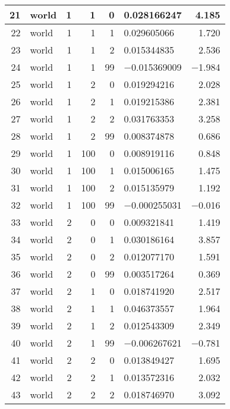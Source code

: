 \begin{longtable}{|r|l|r|r|r|l|r|}
   21 &    world &    1 &    1 &    0 &    0.028166247 &    4.185\\\hline
   22 &    world &    1 &    1 &    1 &    0.029605066 &    1.720\\\hline
   23 &    world &    1 &    1 &    2 &    0.015344835 &    2.536\\\hline
   24 &    world &    1 &    1 &    99 &    $-$0.015369009 &    $-$1.984\\\hline
   25 &    world &    1 &    2 &    0 &    0.019294216 &    2.028\\\hline
   26 &    world &    1 &    2 &    1 &    0.019215386 &    2.381\\\hline
   27 &    world &    1 &    2 &    2 &    0.031763353 &    3.258\\\hline
   28 &    world &    1 &    2 &    99 &    0.008374878 &    0.686\\\hline
   29 &    world &    1 &    100 &    0 &    0.008919116 &    0.848\\\hline
   30 &    world &    1 &    100 &    1 &    0.015006165 &    1.475\\\hline
   31 &    world &    1 &    100 &    2 &    0.015135979 &    1.192\\\hline
   32 &    world &    1 &    100 &    99 &    $-$0.000255031 &    $-$0.016\\\hline
   33 &    world &    2 &    0 &    0 &    0.009321841 &    1.419\\\hline
   34 &    world &    2 &    0 &    1 &    0.030186164 &    3.857\\\hline
   35 &    world &    2 &    0 &    2 &    0.012077170 &    1.591\\\hline
   36 &    world &    2 &    0 &    99 &    0.003517264 &    0.369\\\hline
   37 &    world &    2 &    1 &    0 &    0.018741920 &    2.517\\\hline
   38 &    world &    2 &    1 &    1 &    0.046373557 &    1.964\\\hline
   39 &    world &    2 &    1 &    2 &    0.012543309 &    2.349\\\hline
   40 &    world &    2 &    1 &    99 &    $-$0.006267621 &    $-$0.781\\\hline
   41 &    world &    2 &    2 &    0 &    0.013849427 &    1.695\\\hline
   42 &    world &    2 &    2 &    1 &    0.013572316 &    2.032\\\hline
   43 &    world &    2 &    2 &    2 &    0.018746970 &    3.092\\\hline

\end{longtable}

